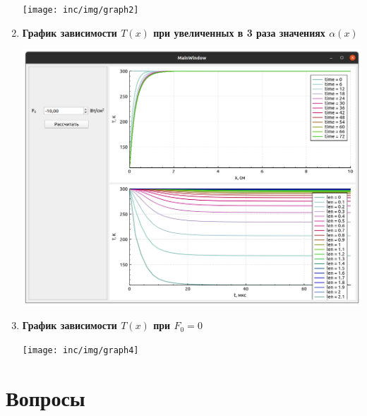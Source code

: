 \documentclass[a4paper,oneside,12pt]{extreport}
\begin{document}
\begin{enumerate}
	\texttt{[image: inc/img/graph2]}


	\item \textbf{График зависимости $T(x)$ при увеличенных в 3 раза значениях $\alpha(x)$}

	\includegraphics[width=\linewidth]{inc/img/graph3}

	\pagebreak
	\item \textbf{График зависимости $T(x)$ при $F_0=0$}

	\texttt{[image: inc/img/graph4]}
\end{enumerate}

\section*{Вопросы}
\end{document}
